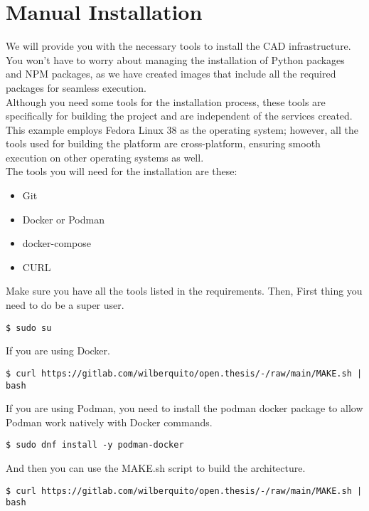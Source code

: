 \section{Manual Installation}
\label{appendix:appendix_a}

We will provide you with the necessary tools to install the CAD infrastructure.
You won't have to worry about managing the installation of Python packages and NPM packages,
as we have created images that include all the required packages for seamless execution. \\

Although you need some tools for the installation process,
these tools are specifically for building the project and are independent of the services created. \\

This example employs Fedora Linux 38 as the operating system; however,
all the tools used for building the platform are cross-platform, ensuring smooth execution on other operating systems as well. \\

The tools you will need for the installation are these:

\begin{itemize}
  \item Git
  \item Docker or Podman
  \item docker-compose
  \item CURL
\end{itemize}

Make sure you have all the tools listed
in the requirements. Then, First thing you need to do be a super user.

\begin{Verbatim}[fontsize=\small]
$ sudo su
\end{Verbatim}

If you are using Docker.

\begin{Verbatim}[fontsize=\small]
$ curl https://gitlab.com/wilberquito/open.thesis/-/raw/main/MAKE.sh | bash
\end{Verbatim}

If you are using Podman, you need to install
the podman docker package to allow Podman work
natively with Docker commands.

\begin{Verbatim}[fontsize=\small]
$ sudo dnf install -y podman-docker
\end{Verbatim}

And then you can use the MAKE.sh script to build the architecture.

\begin{Verbatim}[fontsize=\small]
$ curl https://gitlab.com/wilberquito/open.thesis/-/raw/main/MAKE.sh | bash
\end{Verbatim}
